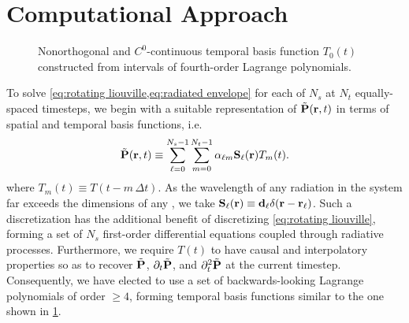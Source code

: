 \section{Computational Approach}
\begin{figure}
  
  \caption{\label{fig:interpolation basis} Nonorthogonal and $C^0$-continuous temporal basis function $T_0(t)$ constructed from intervals of fourth-order Lagrange polynomials.}
\end{figure}
To solve \cref{eq:rotating liouville,eq:radiated envelope} for each of $N_s$ \qds{} at $N_t$ equally-spaced timesteps, we begin with a suitable representation of $\tilde{\vb{P}}(\vb{r}, t)$ in terms of spatial and temporal basis functions, i.e.~
\begin{equation}
  \tilde{\vb{P}}(\vb{r}, t) \equiv \sum_{\ell=0}^{N_s - 1} \sum_{m = 0}^{N_t - 1} \alpha_{\ell m} \vb{S}_\ell(\vb{r}) T_m(t).
  \label{eq:basis function representation}
\end{equation}
where $T_m(t) \equiv T(t - m \, \Delta t)$.
As the wavelength of any radiation in the system far exceeds the dimensions of any \qd{}, we take $\vb{S}_\ell(\vb{r}) \equiv \vb{d}_\ell \delta(\vb{r} - \vb{r}_\ell)$.
Such a discretization has the additional benefit of discretizing \cref{eq:rotating liouville}, forming a set of $N_s$ first-order differential equations coupled through radiative processes.
Furthermore, we require $T(t)$ to have causal and interpolatory properties so as to recover $\tilde{\vb{P}}$, $\partial_t \tilde{\vb{P}}$, and $\partial^2_t \tilde{\vb{P}}$ at the current timestep. 
Consequently, we have elected to use a set of backwards-looking Lagrange polynomials of order $\ge 4$, forming temporal basis functions similar to the one shown in \cref{fig:interpolation basis}.

